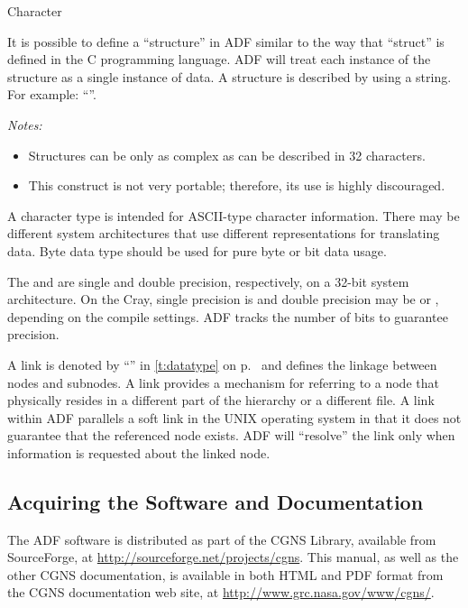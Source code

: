 \begin{Ventryi}{Character}
\item [Structure]
      It is possible to define a ``structure'' in ADF similar to the way
      that ``struct'' is defined in the C programming language.
      ADF will treat each instance of the structure as a single
      instance of data.
      A structure is described by using a string.
      For example: ``''.

      \emph{Notes:}
      \begin{itemize}
      \item Structures can be only as complex as can be described in 32
            characters.
      \item This construct is not very portable; therefore, its use is
            highly discouraged.
      \end{itemize}
\item [Character]
      A character type is intended for ASCII-type character information.
      There may be different system architectures that use different
      representations for translating data.
      Byte data type should be used for pure byte or bit data usage.
\item [Precision]
      The  and  are single and double precision,
      respectively, on a 32-bit system architecture.
      On the Cray, single precision is  and double precision
      may be  or , depending on the compile
      settings.
      ADF tracks the number of bits to guarantee precision.
\item [Link]
      A link is denoted by ``'' in \autoref{t:datatype} on
      p.~\pageref*{t:datatype} and defines the linkage between nodes and
      subnodes.
      A link provides a mechanism for referring to a node that
      physically resides in a different part of the hierarchy or a
      different file.
      A link within ADF parallels a soft link in the UNIX operating
      system in that it does not guarantee that the referenced node
      exists.
      ADF will ``resolve'' the link only when information is requested
      about the linked node.
\end{Ventryi}

\subsection{Acquiring the Software and Documentation}

The ADF software is distributed as part of the CGNS Library, available
from SourceForge, at
\href{http://sourceforge.net/projects/cgns}{http://sourceforge.net/projects/cgns}.
This manual, as well as the other CGNS documentation, is available in
both HTML and PDF format from the CGNS documentation web site, at
\href{http://www.grc.nasa.gov/www/cgns/}{http://www.grc.nasa.gov/www/cgns/}.
